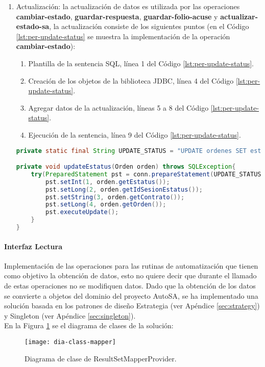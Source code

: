 \begin{enumerate}
	\item Actualización: la actualización de datos es utilizada por las operaciones \textbf{cambiar-estado}, \textbf{guardar-respuesta}, \textbf{guardar-folio-acuse} y \textbf{actualizar-estado-sa}, la actualización consiste de los siguientes puntos (en el Código \ref{lst:per-update-status} se muestra la implementación de la operación \textbf{cambiar-estado}):
	\begin{enumerate}
		\item Plantilla de la sentencia SQL, línea 1 del Código \ref{lst:per-update-status}.
		\item Creación de los objetos de la biblioteca JDBC, línea 4 del Código \ref{lst:per-update-status}.
		\item Agregar datos de la actualización, líneas 5 a 8 del Código \ref{lst:per-update-status}.
		\item Ejecución de la sentencia, línea 9 del Código \ref{lst:per-update-status}.
	\end{enumerate}

	\begin{lstlisting}[language=Java, caption={Actualización del estado de una orden de reposición.}, captionpos=b, label={lst:per-update-status}]
private static final String UPDATE_STATUS = "UPDATE ordenes SET estatus = ?, fecha_estatus = CURRENT_TIMESTAMP, id_sesion_estatus = ? WHERE contrato = ? AND orden = ?";

private void updateEstatus(Orden orden) throws SQLException{
	try(PreparedStatement pst = conn.prepareStatement(UPDATE_STATUS)){
		pst.setInt(1, orden.getEstatus());
		pst.setLong(2, orden.getIdSesionEstatus());
		pst.setString(3, orden.getContrato());
		pst.setLong(4, orden.getOrden());
		pst.executeUpdate();
	}
}
	\end{lstlisting}
\end{enumerate}

\paragraph{\indent Interfaz Lectura\\}
Implementación de las operaciones para las rutinas de automatización que tienen como objetivo la obtención de datos, esto no quiere decir que durante el llamado de estas operaciones no se modifiquen datos.
Dado que la obtención de los datos se convierte a objetos del dominio del proyecto AutoSA, se ha implementado una solución basada en los patrones de diseño Estrategia (ver Apéndice \ref{sec:strategy}) y Singleton (ver Apéndice \ref{sec:singleton}). \\
En la Figura \ref{fig:dia-class-mapper} se el diagrama de clases de la solución:
\begin{figure}[h]
	\centering
	\texttt{[image: dia-class-mapper]}
	\caption{Diagrama de clase de ResultSetMapperProvider.}
	\label{fig:dia-class-mapper}
\end{figure}

